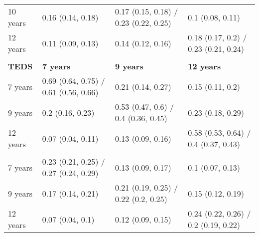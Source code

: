 \begin{tabular}{llll}
10 years & 0.16 (0.14, 0.18) & 0.17 (0.15, 0.18) / 0.23 (0.22, 0.25) & 0.1 (0.08, 0.11) \\
12 years & 0.11 (0.09, 0.13) & 0.14 (0.12, 0.16) & 0.18 (0.17, 0.2) / 0.23 (0.21, 0.24) \\
      &       &       &  \\
\cmidrule{2-4} \textbf{TEDS} & \textbf{7 years} & \textbf{9 years} & \textbf{12 years} \\
      \midrule
7 years & 0.69 (0.64, 0.75) / 0.61 (0.56, 0.66) & 0.21 (0.14, 0.27) & 0.15 (0.11, 0.2) \\
9 years & 0.2 (0.16, 0.23) & 0.53 (0.47, 0.6) / 0.4 (0.36, 0.45) & 0.23 (0.18, 0.29) \\
12 years & 0.07 (0.04, 0.11) & 0.13 (0.09, 0.16) & 0.58 (0.53, 0.64) / 0.4 (0.37, 0.43) \\
      &       &       &  \\
7 years & 0.23 (0.21, 0.25) / 0.27 (0.24, 0.29) & 0.13 (0.09, 0.17) & 0.1 (0.07, 0.13) \\
9 years & 0.17 (0.14, 0.21) & 0.21 (0.19, 0.25) / 0.22 (0.2, 0.25) & 0.15 (0.12, 0.19) \\
12 years & 0.07 (0.04, 0.1) & 0.12 (0.09, 0.15) & 0.24 (0.22, 0.26) / 0.2 (0.19, 0.22) \\
  \bottomrule
\end{tabular}%
